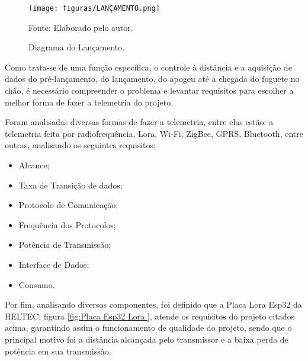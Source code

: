 \begin{figure}[!htb]
\centering
\texttt{[image: figuras/LANÇAMENTO.png]}
\caption{Diagrama do Lançamento.}
{\footnotesize Fonte: Elaborado pelo autor.}
\label{fig:Diagrama lançamento}
\end{figure}

\par Como trata-se de uma função específica, o controle à distância e a aquisição de dados do pré-lançamento, do lançamento, do apogeu até a chegada do foguete no chão, é necessário compreender o problema e levantar requisitos para escolher a melhor forma de fazer a telemetria do projeto.
\par Foram analisadas diversas formas de fazer a telemetria, entre elas estão: a telemetria feita por radiofrequência, Lora, Wi-Fi, ZigBee, GPRS, Bluetooth, entre outras, analisando os seguintes requisitos: 
\begin{itemize}

\item Alcance;
\item Taxa de Transição de dados;
\item Protocolo de Comunicação;
\item Frequência dos Protocolos;
\item Potência de Transmissão; 
\item Interface de Dados;
\item Consumo.

\end{itemize}

\par Por fim, analisando diversos componentes, foi definido que a Placa Lora Esp32 da HELTEC, figura \ref{fig:Placa Esp32 Lora }, atende os requisitos do projeto citados acima, garantindo assim o funcionamento de qualidade do projeto, sendo que o principal motivo foi a distância alcançada pelo transmissor e a baixa perda de potência em sua transmissão.

